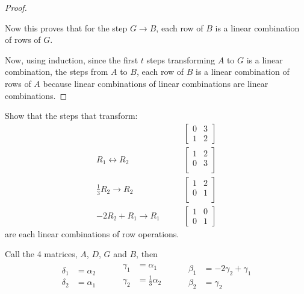 \begin{proof}
\begin{enumerate}[label=(\roman*)]
\end{enumerate}

Now this proves that for the step $G \rightarrow B$, each row of $B$ is a linear combination of rows of $G$.

Now, using induction, since the first $t$ steps transforming $A$ to $G$ is a linear combination, the steps from $A$ to $B$, each row of $B$ is a linear combination of rows of $A$ because linear combinations of linear combinations are linear combinations.

\end{proof}

\vfill \pagebreak

\begin{example}
Show that the steps that transform:
%
\begin{align*}
&\begin{bmatrix}
0 & 3 \\
1 & 2
\end{bmatrix} \\
  R_1 \leftrightarrow R_2  \qquad &
\begin{bmatrix}
1 & 2 \\
0 & 3 \\
\end{bmatrix} \\
\frac{1}{3} R_2 \rightarrow R_2 \qquad &
\begin{bmatrix}
1 & 2 \\
0 & 1 \\
\end{bmatrix} \\
 -2 R_2 + R_1 \rightarrow R_1 \qquad  &
\begin{bmatrix}
1 & 0 \\
0 & 1
\end{bmatrix}
\end{align*}
are each linear combinations of row operations.

\solution

Call the 4 matrices, $A$, $D$, $G$ and $B$, then
%
\begin{align*}
\begin{split}
\delta_1 & = \alpha_2 \\
\delta_2 & = \alpha_1
\end{split} &&&
\begin{split}
\gamma_1 & = \alpha_1 \\
\gamma_2 & = \frac{1}{3} \alpha_2 \\
\end{split} &&&
\begin{split}
\beta_1 & = -2 \gamma_2 + \gamma_1 \\
\beta_2 & = \gamma_2
\end{split}
\end{align*}
\end{example}

